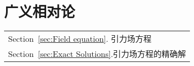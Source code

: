 \part{广义相对论}\label{Part:General Relativity}
	\begin{margintable}\vspace{1.4in}\footnotesize
		\begin{tabularx}{\marginparwidth}{|X}
			Section~\ref{sec:Field equation}. 引力场方程\\
			Section~\ref{sec:Exact Solutions}.引力场方程的精确解\\
		\end{tabularx}
	\end{margintable}

